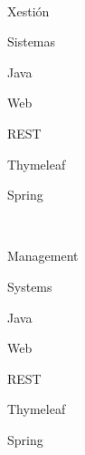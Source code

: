 \begin{multicols}{2}
\begin{description}
\item [\palabraschaveprincipal:] \mbox{} \\[-20pt]
    \item Xestión
    \item Sistemas
    \item Java
    \item Web
    \item REST
    \item Thymeleaf
    \item Spring
\end{description}
\begin{description}
\item [\palabraschavesecundaria:] \mbox{} \\[-20pt]
    \item Management
    \item Systems
    \item Java
    \item Web
    \item REST
    \item Thymeleaf
    \item Spring
\end{description}
\end{multicols}
